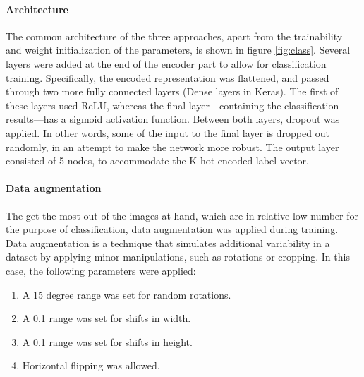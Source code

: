 
\paragraph{Architecture} 
The common architecture of the three approaches, apart from the trainability and weight initialization of the parameters, is shown in figure \ref{fig:class}. Several layers were added at the end of the encoder part to allow for classification training. Specifically, the encoded representation was flattened, and passed through two more fully connected layers (Dense layers in Keras). The first of these layers used ReLU, whereas the final layer---containing the classification results---has a sigmoid activation function. Between both layers, dropout was applied. In other words, some of the input to the final layer is dropped out randomly, in an attempt to make the network more robust. The output layer consisted of 5 nodes, to accommodate the K-hot encoded label vector.

\paragraph{Data augmentation} The get the most out of the images at hand, which are in relative low number for the purpose of classification, data augmentation was applied during training. Data augmentation is a technique that simulates additional variability in a dataset by applying minor manipulations, such as rotations or cropping. In this case, the following parameters were applied:

\begin{enumerate}

	\item A 15 degree range was set for random rotations.
	\item A 0.1 range was set for shifts in width.
	\item A 0.1 range was set for shifts in height.
	\item Horizontal flipping was allowed.
	
\end{enumerate}





